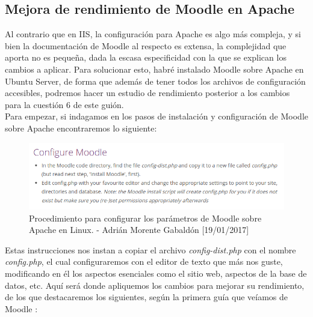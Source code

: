 	\subsection{Mejora de rendimiento de Moodle en Apache}
	Al contrario que en IIS, la configuración para Apache es algo más compleja, y si bien la documentación de Moodle al respecto es extensa, la complejidad que aporta no es pequeña, dada la escasa especificidad con la que se explican los cambios a aplicar. Para solucionar esto, habré instalado Moodle sobre Apache en Ubuntu Server, de forma que además de tener todos los archivos de configuración accesibles, podremos hacer un estudio de rendimiento posterior a los cambios para la cuestión 6 de este guión.\\
	Para empezar, si indagamos en los pasos de instalación y configuración de Moodle sobre Apache encontraremos lo siguiente:
	\begin{figure}[H]
		\centering
		\includegraphics[scale=0.5]{pasos-moodle}
		\caption{Procedimiento para configurar los parámetros de Moodle sobre Apache en Linux. - Adrián Morente Gabaldón [19/01/2017]}
		\label{figura13}
	\end{figure}
	Estas instrucciones nos instan a copiar el archivo \emph{config-dist.php} con el nombre \emph{config.php}, el cual configuraremos con el editor de texto que más nos guste, modificando en él los aspectos esenciales como el sitio web, aspectos de la base de datos, etc. Aquí será donde apliquemos los cambios para mejorar su rendimiento, de los que destacaremos los siguientes, según la primera guía que veíamos de Moodle \cite{moodle-apache}:

